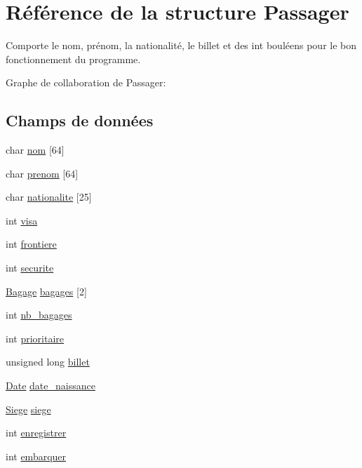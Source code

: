 \hypertarget{structPassager}{}\section{Référence de la structure Passager}
\label{structPassager}


Comporte le nom, prénom, la nationalité, le billet et des int bouléens pour le bon fonctionnement du programme.  




Graphe de collaboration de Passager\+:
\subsection*{Champs de données}
\begin{DoxyCompactItemize}
\item 
char \hyperlink{structPassager_a7cef88f78adc1c6e2152de993d1c26d9}{nom} \mbox{[}64\mbox{]}
\item 
char \hyperlink{structPassager_ada9d7b12765e2cca40a8996d09812f56}{prenom} \mbox{[}64\mbox{]}
\item 
char \hyperlink{structPassager_a83f1c73ed58910a8431e87dc8286ce2f}{nationalite} \mbox{[}25\mbox{]}
\item 
int \hyperlink{structPassager_a9452371d86a818c7587937c9ab8b985f}{visa}
\item 
int \hyperlink{structPassager_a40f2d4995aaa79527e46741900aa1f66}{frontiere}
\item 
int \hyperlink{structPassager_a2bbbc29942279a434417750fa0c90a2a}{securite}
\item 
\hyperlink{structBagage}{Bagage} \hyperlink{structPassager_a46e73dd0649c0605380c7e462eae1ca5}{bagages} \mbox{[}2\mbox{]}
\item 
int \hyperlink{structPassager_a19258a68917220fe9dcaae3ffb9a9fb7}{nb\+\_\+bagages}
\item 
int \hyperlink{structPassager_a516754a9134ff8de4a11dcaf520704cc}{prioritaire}
\item 
unsigned long \hyperlink{structPassager_a16af4487b4c8c88372382c2b2e29207c}{billet}
\item 
\hyperlink{structDate}{Date} \hyperlink{structPassager_a0ddaceb5f0477dde1ddb0e5f7fa36f0e}{date\+\_\+naissance}
\item 
\hyperlink{structSiege}{Siege} \hyperlink{structPassager_a9c7893faf56c15fb959b8ce49ba507b7}{siege}
\item 
int \hyperlink{structPassager_a5373ad9b4bca52b09f32e79c2d6bcffe}{enregistrer}
\item 
int \hyperlink{structPassager_af6a1dac0de31dc6fd1bd60f728619b00}{embarquer}
\end{DoxyCompactItemize}


